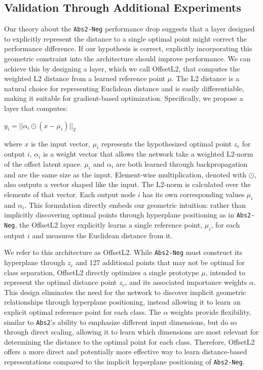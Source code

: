 \subsection{Validation Through Additional Experiments}

Our theory about the \texttt{Abs2-Neg} performance drop suggests that a layer designed to explicitly represent the distance to a single optimal point might correct the performance difference. If our hypothesis is correct, explicitly incorporating this geometric constraint into the architecture should improve performance. We can achieve this by designing a layer, which we call OffsetL2, that computes the weighted L2 distance from a learned reference point $\mu$. The L2 distance is a natural choice for representing Euclidean distance and is easily differentiable, making it suitable for gradient-based optimization. Specifically, we propose a layer that computes:

$y_i = || \alpha_i \odot (x - \mu_i) ||_2$

where $x$ is the input vector, $\mu_i$ represents the hypothesized optimal point $z_c$ for output $i$, $\alpha_i$ is a weight vector  that allows the network take a weighted L2-norm of the offset latent space. $\mu_i$ and $\alpha_i$ are both learned through backpropagation and are the same size as the input. Element-wise multiplication, denoted with $\odot$, also outputs a vector shaped like the input. The L2-norm is calculated over the elements of that vector. Each output node $i$ has its own corresponding values $\mu_i$ and $\alpha_i$. This formulation directly embeds our geometric intuition: rather than implicitly discovering optimal points through hyperplane positioning as in \texttt{Abs2-Neg}, the OffsetL2 layer explicitly learns a single reference point, $\mu_i$, for each output $i$ and measures the Euclidean distance from it.

We refer to this architecture as OffsetL2. While \texttt{Abs2-Neg} must construct its hyperplane through $z_c$ and 127 additional points that may not be optimal for class separation, OffsetL2 directly optimizes a single prototype $\mu$, intended to represent the optimal distance point $z_c$, and its associated importance weights $\alpha$. This design eliminates the need for the network to discover implicit geometric relationships through hyperplane positioning, instead allowing it to learn an explicit optimal reference point for each class. The $\alpha$ weights provide flexibility, similar to \texttt{Abs2}'s ability to emphasize different input dimensions, but do so through direct scaling, allowing it to learn which dimensions are most relevant for determining the distance to the optimal point for each class. Therefore, OffsetL2 offers a more direct and potentially more effective way to learn distance-based representations compared to the implicit hyperplane positioning of \texttt{Abs2-Neg}.

